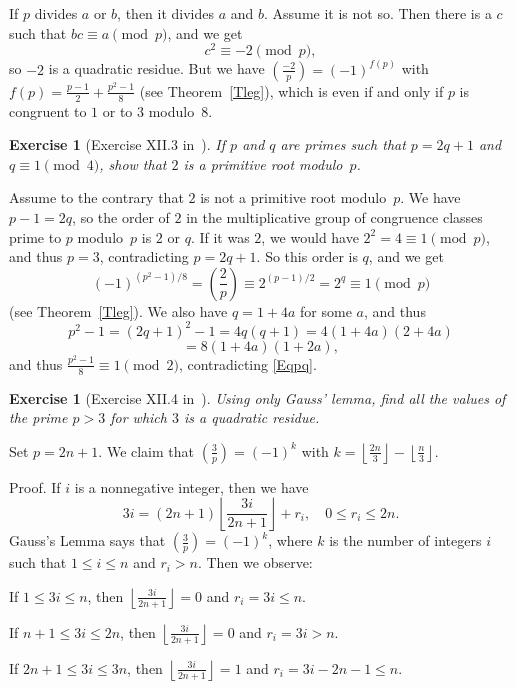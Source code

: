 \documentclass[12pt,letterpaper]{article}
\newtheorem{exer}[thm]{Exercise}
\theoremstyle{definition}
\begin{document}
If $p$ divides $a$ or $b$, then it divides $a$ and $b$. Assume it is not so. Then there is a $c$ such that $bc\equiv a\pmod p$, and we get 
$$
c^2\equiv-2\pmod p,
$$ 
so $-2$ is a quadratic residue. But we have $(\frac{-2}{p})=(-1)^{f(p)}$ with $f(p)=\frac{p-1}{2}+\frac{p^2-1}{8}$ (see Theorem~\ref{Tleg}), which is even if and only if $p$ is congruent to $1$ or to $3$ modulo~$8$. 

\begin{exer}[Exercise XII.3 in~\cite{weil1979}]
If $p$ and $q$ are primes such that $p=2q+1$ and $q\equiv 1\pmod 4$, show that $2$ is a primitive root modulo~$p$.
\end{exer}

Assume to the contrary that $2$ is not a primitive root modulo~$p$. We have $p-1=2q$, so the order of $2$ in the multiplicative group of congruence classes prime to $p$ modulo~$p$ is $2$ or $q$. If it was $2$, we would have $2^2=4\equiv 1\pmod p$, and thus $p=3$, contradicting $p=2q+1$. So this order is $q$, and we get 
\begin{equation}\label{Eqpq}
(-1)^{(p^2-1)/8}=\left(\frac{2}{p}\right)\equiv 2^{(p-1)/2}=2^q\equiv 1\pmod p
\end{equation} 
(see Theorem~\ref{Tleg}). We also have $q=1+4a$ for some $a$, and thus 
$$
p^2-1=(2q+1)^2-1=4q(q+1)=4(1+4a)(2+4a)
$$ 
$$
=8(1+4a)(1+2a),
$$ 
and thus $\frac{p^2-1}{8}\equiv1\pmod2$, contradicting \eqref{Eqpq}. 

\begin{exer}[Exercise XII.4 in~\cite{weil1979}]
Using only Gauss' lemma, find all the values of the prime $p>3$ for which $3$ is a quadratic residue.
\end{exer} 

Set $p=2n+1$. We claim that $(\frac{3}{p})=(-1)^k$ with $k=\left\lfloor\frac{2n}{3}\right\rfloor-\left\lfloor\frac{n}{3}\right\rfloor$. 

Proof. If $i$ is a nonnegative integer, then we have 
$$
3i=(2n+1)\left\lfloor\frac{3i}{2n+1}\right\rfloor+r_i,\quad 0\le r_i\le2n.
$$ 
Gauss's Lemma says that $(\frac{3}{p})=(-1)^k$, where $k$ is the number of integers $i$ such that $1\le i\le n$ and $r_i>n$. Then we observe: 

If $1\le 3i\le n$, then $\left\lfloor\frac{3i}{2n+1}\right\rfloor=0$ and $r_i=3i\le n$. 

If $n+1\le 3i\le 2n$, then $\left\lfloor\frac{3i}{2n+1}\right\rfloor=0$ and $r_i=3i>n$. 

If $2n+1\le 3i\le 3n$, then $\left\lfloor\frac{3i}{2n+1}\right\rfloor=1$ and $r_i=3i-2n-1\le n$. 
\end{document}
